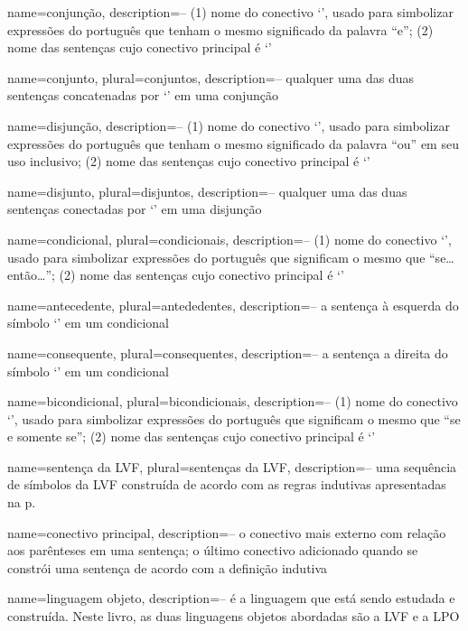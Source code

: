 {
name=conjunção,
description={-- (1) nome do conectivo `\eand', usado para simbolizar expressões do português que tenham o mesmo significado da palavra ``e''; (2) nome das sentenças cujo conectivo principal é `\eand'}
}

{
name=conjunto,
plural=conjuntos,
description={-- qualquer uma das duas sentenças concatenadas por `\eand' em uma conjunção}
}

{
name=disjunção,
description={-- (1) nome do conectivo `\eor', usado para simbolizar expressões do português que tenham o mesmo significado da palavra ``ou'' em seu uso inclusivo; (2) nome das sentenças cujo conectivo principal é `\eor'}
}

{
name=disjunto,
plural=disjuntos,
description={-- qualquer uma das duas sentenças conectadas por `\eor' em uma disjunção}
}

{
name=condicional,
plural=condicionais,
description={-- (1) nome do conectivo `\eif', usado para simbolizar expressões do português que significam o mesmo que ``se\ldots{}então\ldots''; (2) nome das sentenças cujo conectivo principal é `\eif'}
}

{
name=antecedente,
plural=antededentes,
description={-- a sentença à esquerda do símbolo `\eif' em um condicional}
}

{
name=consequente,
plural=consequentes,
description={-- a sentença a direita do símbolo `\eif' em um condicional}
}

{
name=bicondicional,
plural=bicondicionais,
description={-- (1) nome do conectivo `\eiff', usado para simbolizar expressões do português que significam o mesmo que ``se e somente se''; (2) nome das sentenças cujo conectivo principal é `\eiff'}
}

{
name=sentença da LVF,
plural=sentenças da LVF,
description={-- uma sequência de símbolos da LVF construída de acordo com as regras indutivas apresentadas na p.~\pageref{TFLsentences}}
}

{
name=conectivo principal,
description={-- o conectivo mais externo com relação aos parênteses em uma sentença; o último conectivo adicionado quando se constrói uma sentença de acordo com a definição indutiva}
}

{
name=linguagem objeto,
description={-- é a linguagem que está sendo estudada e construída. Neste livro, as duas linguagens objetos abordadas são a LVF e a LPO}
}

